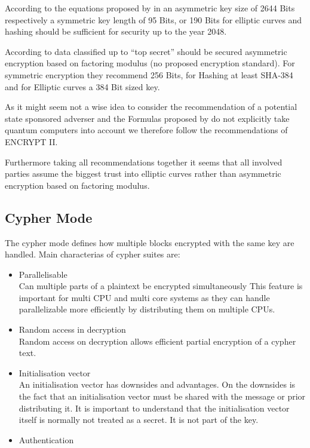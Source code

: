 According to the equations proposed by \citeauthor{Lenstra04keylength.} in \cite{Lenstra04keylength.} an asymmetric key size of 2644 Bits respectively a symmetric key length of 95 Bits, or 190 Bits for elliptic curves and hashing should be sufficient for security up to the year 2048. 

According to \cite{nsa-fact-sheet-B} data classified up to ``top secret'' should be secured asymmetric encryption based on factoring modulus (no proposed encryption standard).  For symmetric encryption they recommend 256 Bits, for Hashing at least SHA-384 and for Elliptic curves a 384 Bit sized key.

As it might seem not a wise idea to consider the recommendation of a potential state sponsored adverser and the Formulas proposed by \citeauthor{Lenstra04keylength.} do not explicitly take quantum computers into account we therefore follow the recommendations of ENCRYPT II.

Furthermore taking all recommendations together it seems that all involved parties assume the biggest trust into elliptic curves rather than asymmetric encryption based on factoring modulus.

\subsection{Cypher Mode}
The cypher mode defines how multiple blocks encrypted with the same key are handled. Main characterias of cypher suites are:
\begin{itemize}
	\item Parallelisable\\ 
	Can multiple parts of a plaintext be encrypted simultaneously This feature is important for multi CPU and multi core systems as they can handle parallelizable more efficiently by distributing them on multiple CPUs.
	\item Random access in decryption\\
	Random access on decryption allows efficient partial encryption of a cypher text.
	\item Initialisation vector\\
	An initialisation vector has downsides and advantages. On the downsides is the fact that an initialisation vector must be shared with the message or prior distributing it. It is important to understand that the initialisation vector itself is normally not treated as a secret. It is not part of the key.
	\item Authentication
\end{itemize}

